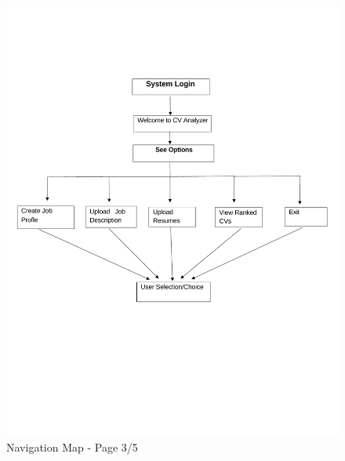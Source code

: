 \begin{figure}[h]
    \centering
    \includegraphics[width=1\linewidth,page=3]{img/diagrams/Updated_Navigation_Map_PDF.pdf}
    \caption{Navigation Map - Page 3/5}
\end{figure}

